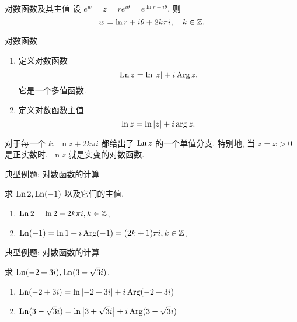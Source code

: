 \begin{frame}{对数函数及其主值}
	\onslide<+->
	设 $e^w=z=re^{i\theta}=e^{\ln r+i\theta}$,
	\onslide<+->
	则
	\[w=\ln r+i\theta+2k\pi i,\quad k\in{\mathbb{Z}}.\]
	\vspace{-\baselineskip}
	\onslide<+->
	\begin{alertblock}{对数函数}
		\begin{enumerate}
			\item 定义对数函数
				\[\operatorname{Ln} z=\ln\left|z\right|+i\operatorname{Arg} z.\]
				它是一个多值函数.
			\item 定义对数函数主值
				\[\ln z=\ln\left|z\right|+i\arg z.\]
				\vspace{-\baselineskip}
		\end{enumerate}
	\end{alertblock}

	\onslide<+->
	对于每一个 $k$, $\ln z+2k\pi i$ 都给出了 $\operatorname{Ln} z$ 的一个单值分支.
	\onslide<+->
	特别地, 当 $z=x>0$ 是正实数时, $\ln z$ 就是实变的对数函数.
\end{frame}


\begin{frame}{典型例题: 对数函数的计算}
	\onslide<+->
	\begin{example}
		求 $\operatorname{Ln} 2,\operatorname{Ln}(-1)$ 以及它们的主值.
	\end{example}

	\onslide<+->
	\begin{solution}
		\begin{enumerate}
			\item $\operatorname{Ln}2=\ln2+2k\pi i, k\in{\mathbb{Z}}$,
			\onslide<+->{主值就是 $\ln 2$.}
			\item $\operatorname{Ln}(-1)=\ln1+i\operatorname{Arg}(-1)=(2k+1)\pi i, k\in{\mathbb{Z}}$,
			\onslide<+->{主值是 $\pi i$.}
		\end{enumerate}
	\end{solution}
\end{frame}


\begin{frame}{典型例题: 对数函数的计算}
	\onslide<+->
	\begin{example}
	求 $\operatorname{Ln}(-2+3i),\operatorname{Ln}(3-\sqrt3 i)$.
	\end{example}

	\onslide<+->
	\begin{solution}
		\begin{enumerate}
			\item $\operatorname{Ln}(-2+3i)=\ln\left|-2+3i\right|+i\operatorname{Arg}(-2+3i)$

			\item $\operatorname{Ln}(3-\sqrt3i)=\ln\left|3+\sqrt 3i\right|+i\operatorname{Arg}(3-\sqrt 3i)$

		\end{enumerate}
	\end{solution}
\end{frame}


